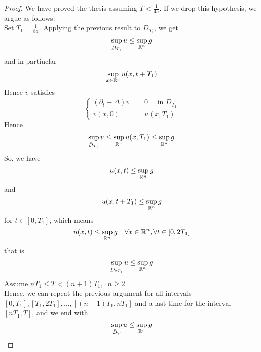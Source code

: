 \begin{ProofBox}
\begin{proof}
        We have proved the thesis assuming $T < \frac{1}{4a}$. If we drop this hypothesis, we argue as follows:\\
        Set $T_1 = \frac{1}{8a}$. Applying the previous result to $D_{T_1}$, we get 
        \begin{equation*}
            \sup_{\Bar{D}_{T_1}} u \leq \sup_{\mathbb{R}^n}g
        \end{equation*}
        and in partiuclar 
        \begin{equation*}
            \sup_{x \in \mathbb{R}^n} u(x,t+T_1)
        \end{equation*}
        Hence $v$ satisfies
        \begin{equation*}
            \begin{cases}
                (\partial_t - \Delta) v &= 0 \quad \text{ in } D_{T_1}\\
                v(x,0) &= u(x,T_1)
            \end{cases}
        \end{equation*}
        Hence
        \begin{equation*}
            \sup_{\Bar{D}_{T_1}} v \leq \sup_{\mathbb{R}^n} u(x,T_1) \leq \sup_{\mathbb{R}^n} g
        \end{equation*}
        So, we have 
        \begin{equation*}
            u(x,t) \leq \sup_{\mathbb{R}^n} g
        \end{equation*}
        and
        \begin{equation*}
            u(x,t+T_1) \leq \sup_{\mathbb{R}^n} g
        \end{equation*}
        for $t \in [0,T_1]$, which means 
        \begin{equation*}
            u(x,t) \leq \sup_{\mathbb{R}^n} g \quad \forall x \in \mathbb{R}^n, \forall t \in [0,2T_1]
        \end{equation*}
        that is 
        \begin{equation*}
             \sup_{\Bar{D}_{2 T_1}} u \leq \sup_{\mathbb{R}^n} g
        \end{equation*}
        Assume $n T_1 \leq T < (n+1) T_1, \exists n \geq 2$. \\
        Hence, we can repeat the previous argument for all intervals $[0,T_1], [T_1, 2T_1], \ldots, [(n-1) T_1, nT_1]$ and a last time for the interval $[nT_1,T]$, and we end with
        \begin{equation*}
            \sup_{\Bar{D}_T} u \leq \sup_{\mathbb{R}^n} g
        \end{equation*}
    \end{proof}
\end{ProofBox}
